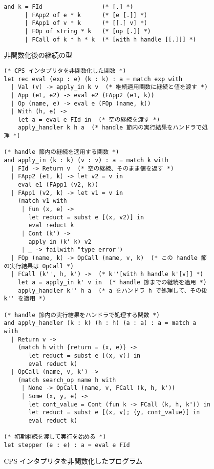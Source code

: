 
\begin{figure}
\begin{verbatim}
and k = FId                 (* [.] *)
      | FApp2 of e * k      (* [e [.]] *)
      | FApp1 of v * k      (* [[.] v] *)
      | FOp of string * k   (* [op [.]] *)
      | FCall of k * h * k  (* [with h handle [[.]]] *)
\end{verbatim}
\caption{非関数化後の継続の型}
\label{figure:k_2defun}
\end{figure}

\begin{figure}
\begin{verbatim}
(* CPS インタプリタを非関数化した関数 *)
let rec eval (exp : e) (k : k) : a = match exp with
  | Val (v) -> apply_in k v  (* 継続適用関数に継続と値を渡す *)
  | App (e1, e2) -> eval e2 (FApp2 (e1, k))
  | Op (name, e) -> eval e (FOp (name, k))
  | With (h, e) ->
    let a = eval e FId in  (* 空の継続を渡す *)
    apply_handler k h a  (* handle 節内の実行結果をハンドラで処理 *)

(* handle 節内の継続を適用する関数 *)
and apply_in (k : k) (v : v) : a = match k with
  | FId -> Return v  (* 空の継続、そのまま値を返す *)
  | FApp2 (e1, k) -> let v2 = v in
    eval e1 (FApp1 (v2, k))
  | FApp1 (v2, k) -> let v1 = v in
    (match v1 with
     | Fun (x, e) ->
       let reduct = subst e [(x, v2)] in
       eval reduct k
     | Cont (k') ->
       apply_in (k' k) v2
     | _ -> failwith "type error")
  | FOp (name, k) -> OpCall (name, v, k)  (* この handle 節の実行結果は OpCall *)
  | FCall (k'', h, k') ->  (* k''[with h handle k'[v]] *)
    let a = apply_in k' v in  (* handle 節までの継続を適用 *)
    apply_handler k'' h a  (* a をハンドラ h で処理して、その後 k'' を適用 *)

(* handle 節内の実行結果をハンドラで処理する関数 *)
and apply_handler (k : k) (h : h) (a : a) : a = match a with
  | Return v ->
    (match h with {return = (x, e)} ->
       let reduct = subst e [(x, v)] in
       eval reduct k)
  | OpCall (name, v, k') ->
    (match search_op name h with
     | None -> OpCall (name, v, FCall (k, h, k'))
     | Some (x, y, e) ->
       let cont_value = Cont (fun k -> FCall (k, h, k')) in
       let reduct = subst e [(x, v); (y, cont_value)] in
       eval reduct k)

(* 初期継続を渡して実行を始める *)
let stepper (e : e) : a = eval e FId
\end{verbatim}
\caption{CPS インタプリタを非関数化したプログラム}
\label{figure:2defun}
\end{figure}

